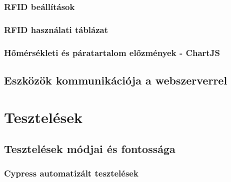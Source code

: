 \documentclass[
]{thesis-ekf}
\theoremstyle{definition}
\theoremstyle{remark}
\begin{document}
	\subsection{RFID beállítások}
	\subsection{RFID használati táblázat}
	\subsection{Hőmérsékleti és páratartalom előzmények - ChartJS}
	\section{Eszközök kommunikációja a webszerverrel}
	
	\chapter{Tesztelések}
	\section{Tesztelések módjai és fontossága}
	
	\subsection{Cypress automatizált tesztelések}
\end{document}
